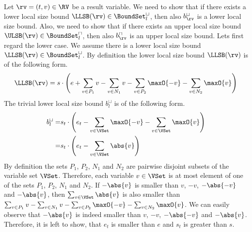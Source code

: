 Let $\rv = (t,v) \in \RV$ be a result variable.
We need to show that if there exists a lower local size bound $\LLSB(\rv) \in \BoundSet^\sqcup_l$, then also $b^\sqcup_\rv$ is a lower local size bound.
Also, we need to show that if there exists an upper local size bound $\ULSB(\rv) \in \BoundSet^\sqcap_l$, then also $b^\sqcap_\rv$ is an upper local size bound.
Lets first regard the lower case.
We assume there is a lower local size bound $\LLSB(\rv) \in \BoundSet^\sqcup_l$.
By definition the lower local size bound $\LLSB(\rv)$ is of the following form.
\[ \LLSB(\rv) = s \cdot \left(e + \sum_{v \in P_1} v - \sum_{v \in N_1} v - \sum_{v \in P_2} \maxO{-v} - \sum_{v \in N_2} \maxO{v} \right) \]
The trivial lower local size bound $b^\sqcup_l$ is of the following form.
\begin{align*}
  b^\sqcup_l = & s_t \cdot \left(e_t - \sum_{v \in \VSet} \maxO{-v} - \sum_{v \in \VSet} \maxO{v} \right) \\
  = & s_t \cdot \left(e_t - \sum_{v \in \VSet} \abs{v} \right)
\end{align*}
By definition the sets $P_1$, $P_2$, $N_1$ and $N_2$ are pairwise disjoint subsets of the variable set $\VSet$.
Therefore, each variable $v \in \VSet$ is at most element of one of the sets $P_1$, $P_2$, $N_1$ and $N_2$.
If $-\abs{v}$ is smaller than $v$, $-v$, $-\abs{-v}$ and $-\abs{v}$, then $\sum_{v \in \VSet} \abs{v}$ is also smaller than $\sum_{v \in P_1} v - \sum_{v \in N_1} v - \sum_{v \in P_2} \maxO{-v} - \sum_{v \in N_2} \maxO{v}$.
We can easily observe that $-\abs{v}$ is indeed smaller than $v$, $-v$, $-\abs{-v}$ and $-\abs{v}$.
Therefore, it is left to show, that $e_t$ is smaller than $e$ and $s_t$ is greater than $s$.
